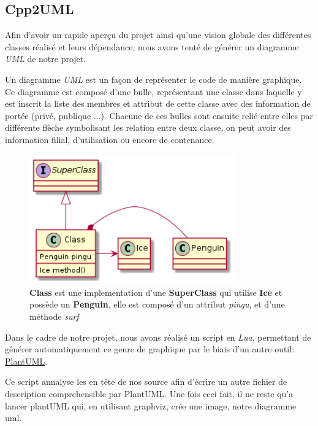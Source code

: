 \subsection{Cpp2UML}

Afin d'avoir un rapide aperçu du projet ainsi qu'une vision globale des différentes classes réalisé et leurs dépendance,
nous avons tenté de générer un diagramme \textit{UML} de notre projet.

Un diagramme \textit{UML} est un façon de représenter le code de manière graphique.
Ce diagramme est composé d'une bulle, représentant une classe dans laquelle y est inscrit la liste des membres et attribut de cette classe avec des information de portée (privé, publique ...).
Chacune de ces bulles sont ensuite relié entre elles par différente flèche symbolisant les relation entre deux classe, on peut avoir des information filial, d'utilisation ou encore de contenance.

\begin{figure}[h!]
	\centering
	\includegraphics[width=0.8\textwidth]{img/uml_example.png}
	\caption{\textbf{Class} est une implementation d'une \textbf{SuperClass} qui utilise \textbf{Ice} et possède un \textbf{Penguin}, elle est composé d'un attribut \textit{pingu}, et d'une méthode \textit{surf}}
\end{figure}
\pagebreak
Dans le cadre de notre projet, nous avons réalisé un script en \textit{Lua},
permettant de générer automatiquement ce genre de graphique par le biais d'un autre outil:
\href{http://plantuml.sourceforge.net/}{PlantUML}.

Ce script annalyse les en tête de nos source afin d'écrire un autre fichier de description comprehensible par PlantUML. Une fois ceci fait, il ne reste qu'a lancer plantUML qui, en utilisant graphviz, crée une image, notre diagramme uml.
